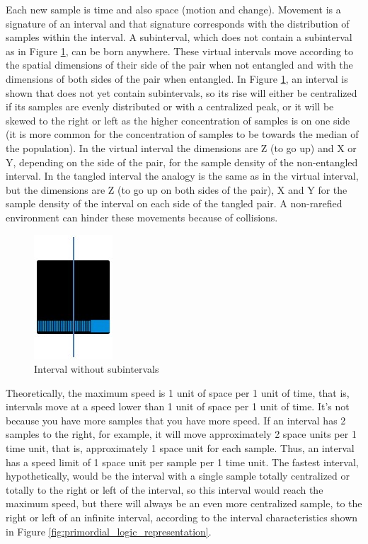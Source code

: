 Each new sample is time and also space (motion and change). Movement is a signature of an interval and that signature corresponds with the distribution of samples within the interval. A subinterval, which does not contain a subinterval as in Figure \ref{fig:consciousness_space_plan_nosubinterval}, can be born anywhere. These virtual intervals move according to the spatial dimensions of their side of the pair when not entangled and with the dimensions of both sides of the pair when entangled. In Figure \ref{fig:consciousness_space_plan_nosubinterval}, an interval is shown that does not yet contain subintervals, so its rise will either be centralized if its samples are evenly distributed or with a centralized peak, or it will be skewed to the right or left as the higher concentration of samples is on one side (it is more common for the concentration of samples to be towards the median of the population). In the virtual interval the dimensions are Z (to go up) and X or Y, depending on the side of the pair, for the sample density of the non-entangled interval. In the tangled interval the analogy is the same as in the virtual interval, but the dimensions are Z (to go up on both sides of the pair), X and Y for the sample density of the interval on each side of the tangled pair. A non-rarefied environment can hinder these movements because of collisions.
	\begin{figure}[H]
	\caption{ Interval without subintervals}
	\label{fig:consciousness_space_plan_nosubinterval}
	\centering
	\includegraphics[scale=.7]{sections/images/consciousness_space_plan_nosubinterval.jpg}
	\end{figure}

Theoretically, the maximum speed is 1 unit of space per 1 unit of time, that is, intervals move at a speed lower than 1 unit of space per 1 unit of time. It's not because you have more samples that you have more speed. If an interval has 2 samples to the right, for example, it will move approximately 2 space units per 1 time unit, that is, approximately 1 space unit for each sample. Thus, an interval has a speed limit of 1 space unit per sample per 1 time unit. The fastest interval, hypothetically, would be the interval with a single sample totally centralized or totally to the right or left of the interval, so this interval would reach the maximum speed, but there will always be an even more centralized sample, to the right or left of an infinite interval, according to the interval characteristics shown in Figure \ref{fig:primordial_logic_representation}.

